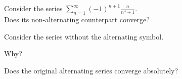 \documentclass{ximera}
\begin{document}
\begin{problem}
Consider the series $\displaystyle{\sum_{n=1}^\infty (-1)^{n+1} \frac{n}{n^3 + 1}}$.\\
Does its non-alternating counterpart converge?
\begin{hint} 
Consider the series without the alternating symbol.
\end{hint}
\begin{multipleChoice}
\end{multipleChoice}

Why?
\begin{multipleChoice}
\end{multipleChoice}



Does the original alternating series converge absolutely?
\begin{multipleChoice}
\end{multipleChoice}

\end{problem}
\end{document}
